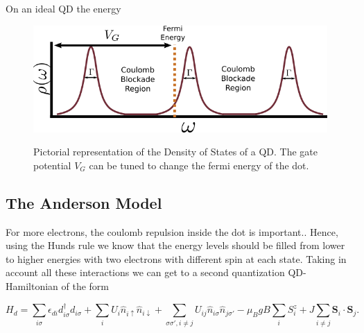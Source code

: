 



On an ideal QD the energy
\begin{figure}[bt]
    \centering
    \includegraphics[scale=0.65]{IMAGES/Preliminars/specDot.png}
    \label{fig:specDots}
    \caption{Pictorial representation of the Density of States of a QD. The gate potential $V_G$ can be tuned to change the fermi energy of the dot.  \protect{} }
\end{figure}

\subsection{The Anderson Model}

For more electrons, the coulomb
repulsion inside the dot is important.. Hence, using the Hunds rule we know that the energy levels should be filled from lower to higher energies with two electrons with different spin at each state. Taking in account
all these interactions we can get to a second quantization QD-Hamiltonian
of the form \citep[(3.2)]{sindel_numerical_2005}

\[
H_{d}=\sum_{i\sigma}\epsilon_{di}d_{i\sigma}^{\dagger}d_{i\sigma}+\sum_{i}U_{i}\hat{n}_{i\uparrow}\hat{n}_{i\downarrow}+\sum_{\sigma\sigma',i\neq j}U_{ij}\hat{n}_{i\sigma}\hat{n}_{j\sigma'}-\mu_{B}gB\sum_{i}S_{i}^{z}+J\sum_{i\neq j}\mathbf{S}_{i}\cdot\mathbf{S}_{j}.
\]


